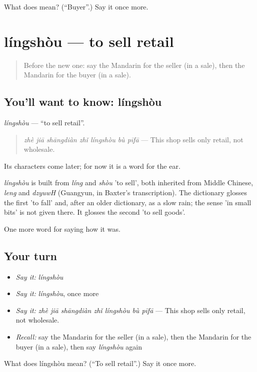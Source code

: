 \begin{tcolorbox}[breakable,colback=teal!4,colframe=teal!35!black,title={Before you move on}]
What does  mean? (\textquotedblleft{}Buyer\textquotedblright{}.) Say it once more.
\end{tcolorbox}
\section[língshòu]{língshòu — to sell retail}

\label{lesson:ZH-C523-lingshou}



\begin{quote}
Before the new one: say the Mandarin for the seller (in a sale), then the Mandarin for the buyer (in a sale).
\end{quote}

\subsection*{You'll want to know: língshòu}
\emph{língshòu} — \textquotedblleft{}to sell retail\textquotedblright{}.

\begin{quote}
\emph{zhè jiā shāngdiàn zhǐ língshòu bù pīfā} — This shop sells only retail, not wholesale.
\end{quote}

Its characters come later; for now it is a word for the ear.

\begin{cousinweb}
\emph{língshòu} is built from \emph{líng} and \emph{shòu} 'to sell', both inherited from Middle Chinese, \emph{leng} and \emph{dzyuwH} (Guangyun, in Baxter's transcription). The dictionary glosses the first 'to fall' and, after an older dictionary, as a slow rain; the sense 'in small bits' is not given there. It glosses the second 'to sell goods'.
\end{cousinweb}

\begin{grammarlens}[title={What you've built}]
One more word for saying how it was.
\end{grammarlens}

\subsection*{Your turn}
\begin{itemize}
\raggedright
  \item \emph{Say it:} \emph{língshòu}
  \item \emph{Say it:} \emph{língshòu}, once more
  \item \emph{Say it:} \emph{zhè jiā shāngdiàn zhǐ língshòu bù pīfā} — This shop sells only retail, not wholesale.
  \item \emph{Recall:} say the Mandarin for the seller (in a sale), then the Mandarin for the buyer (in a sale), then say \emph{língshòu} again
\end{itemize}

\begin{tcolorbox}[breakable,colback=teal!4,colframe=teal!35!black,title={Before you move on}]
What does língshòu mean? (\textquotedblleft{}To sell retail\textquotedblright{}.) Say it once more.
\end{tcolorbox}
